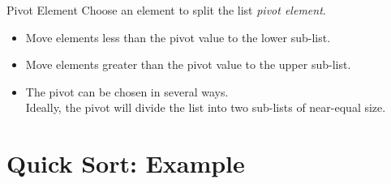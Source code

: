 \documentclass[14pt,aspectratio=1610]{beamer}
\begin{document}
\begin{frame}{Pivot Element}
Choose an element to split the list \emph{pivot element}.
\begin{itemize}
\item
  Move elements less than the pivot value to the lower sub-list.
\item
  Move elements greater than the pivot value to the upper sub-list.
\item
  The pivot can be chosen in several ways.\\
  Ideally, the pivot will divide the list into two sub-lists of near-equal size.
\end{itemize}
\end{frame}

\section{Quick Sort: Example}

\end{document}
